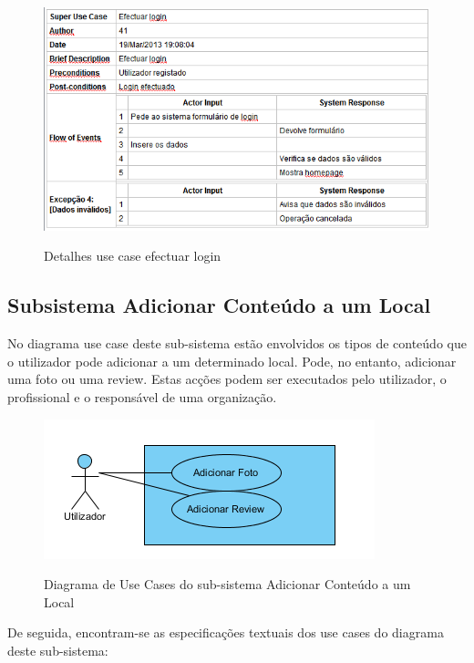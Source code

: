 \documentclass[12pt,a4paper]{article}
\begin{document}
\clearpage
\newpage

\begin{figure}[h!]
\centering
\includegraphics[scale=0.7]{d_usecase/login}
\label{usecase}
\caption{Detalhes use case efectuar login}
\end{figure}


\subsection{Subsistema Adicionar Conteúdo a um Local}
No diagrama use case deste sub-sistema estão envolvidos os tipos de conteúdo que o utilizador pode adicionar a um determinado local. Pode, no entanto, adicionar uma foto ou uma review. Estas acções podem ser executados pelo utilizador, o profissional e o responsável de uma organização.\\

\begin{figure}[h!]
\centering
\includegraphics[scale=1]{usecase/U_AdicionarConteudo}
\label{usecase}
\caption{Diagrama de Use Cases do sub-sistema Adicionar Conteúdo a um Local}
\end{figure}

De seguida, encontram-se as especificações textuais dos use cases do diagrama deste sub-sistema:\\
\end{document}
